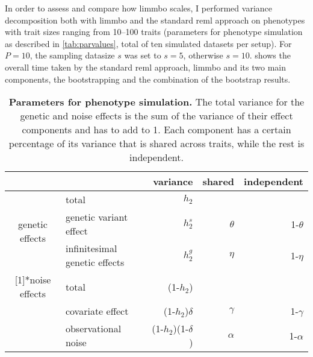 In order to assess and compare how \gls{limmbo} scales, I performed variance decomposition both with \gls{limmbo} and the standard \gls{reml} approach on phenotypes with trait sizes ranging from \numrange{10}{100} traits (parameters for phenotype simulation as described in \cref{tab:parvalues}, total of ten simulated datasets per setup). For \(P=10\), the sampling datasize \(s\) was set to \(s=5\), otherwise  \(s=10\).   shows the overall time taken by the standard \gls{reml} approach, \gls{limmbo} and its two main components, the bootstrapping and the combination of the bootstrap results.
\begin{table}[htbp]
  \centering
  \caption[\textbf{Parameters for phenotype simulation.}]{\textbf{Parameters for phenotype simulation.} The total variance for the genetic and noise effects is the sum of the variance of their effect components and has to add to 1. Each component has a certain percentage of its variance that is shared across traits, while the rest is independent.}
    \begin{tabular}{clrrr}
    \toprule
          &       & variance & shared & independent \\
    \midrule
    \multirow{3}[1]{*}{genetic effects} & total & \(h_2\) &       &  \\
          & genetic variant effect & \(h_2^s\) & \(\theta\) & 1-\(\theta\) \\
          & infinitesimal genetic effects & \(h_2^g\) & \(\eta\) & 1-\(\eta\) \\
   \addlinespace[1.5ex]
    \multirow{3}[1]{*}{noise effects} & total & (1-\(h_2\)) &       &  \\
          & covariate effect & (1-\(h_2\))\(\delta\) & \(\gamma\) & 1-\(\gamma\) \\
          & observational noise & (1-\(h_2\))(1-\(\delta\)) & \(\alpha\) & 1-\(\alpha\) \\
    \bottomrule
    \end{tabular}%
  \label{tab:pardescription}%
\end{table}%
%
